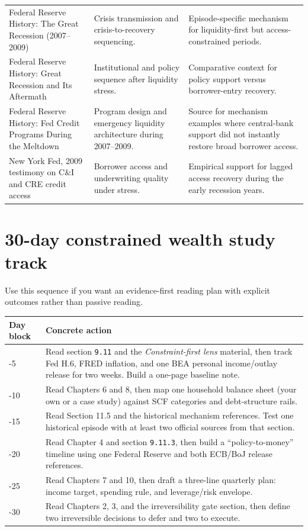 \documentclass[11pt,openany]{book}
\begin{document}
\begin{longtable}{>{\raggedright\arraybackslash}p{}p{}p{}}
Federal Reserve History: The Great Recession (2007--2009) & Crisis transmission and crisis-to-recovery sequencing. & Episode-specific mechanism for liquidity-first but access-constrained periods. \\
Federal Reserve History: Great Recession and Its Aftermath & Institutional and policy sequence after liquidity stress. & Comparative context for policy support versus borrower-entry recovery. \\
Federal Reserve History: Fed Credit Programs During the Meltdown & Program design and emergency liquidity architecture during 2007--2009. & Source for mechanism examples where central-bank support did not instantly restore broad borrower access. \\
New York Fed, 2009 testimony on C\&I and CRE credit access & Borrower access and underwriting quality under stress. & Empirical support for lagged access recovery during the early recession years. \\
\bottomrule
\end{longtable}

\section{30-day constrained wealth study track}

Use this sequence if you want an evidence-first reading plan with explicit outcomes rather than passive reading.

\begin{center}
\begin{tabularx}{\textwidth}{>{\raggedright\arraybackslash}p{}X}
\toprule
\textbf{Day block} & \textbf{Concrete action} \\
\midrule
1-5 & Read section \texttt{9.11} and the \textit{Constraint-first lens} material, then track Fed H.6, FRED inflation, and one BEA personal income/outlay release for two weeks. Build a one-page baseline note. \\
6-10 & Read Chapters 6 and 8, then map one household balance sheet (your own or a case study) against SCF categories and debt-structure rails. \\
11-15 & Read Section 11.5 and the historical mechanism references. Test one historical episode with at least two official sources from that section. \\
16-20 & Read Chapter 4 and section \texttt{9.11.3}, then build a ``policy-to-money'' timeline using one Federal Reserve and both ECB/BoJ release references. \\
21-25 & Read Chapters 7 and 10, then draft a three-line quarterly plan: income target, spending rule, and leverage/risk envelope. \\
26-30 & Read Chapters 2, 3, and the irreversibility gate section, then define two irreversible decisions to defer and two to execute. \\
\bottomrule
\end{tabularx}
\end{center}
\end{document}
